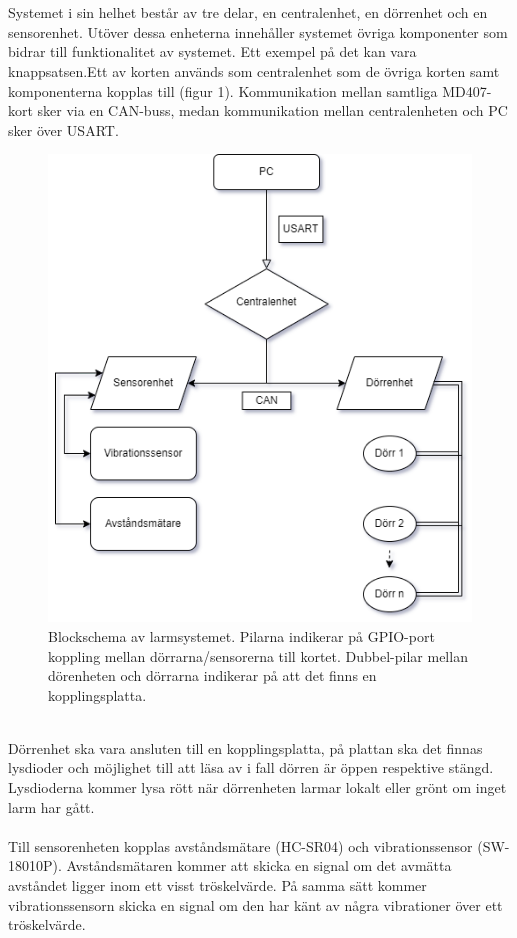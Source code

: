 \documentclass{article}
\begin{document}
\\
\\
\noindent
Systemet i sin helhet består av tre delar, en centralenhet, en dörrenhet och en sensorenhet. Utöver dessa enheterna innehåller systemet övriga komponenter som bidrar till funktionalitet av systemet. Ett exempel på det kan vara knappsatsen.Ett av korten används som centralenhet som de övriga korten samt komponenterna kopplas till (figur 1). Kommunikation mellan samtliga MD407-kort sker via en CAN-buss, medan kommunikation mellan centralenheten och PC sker över USART.
\\
\begin{figure}[h]
    \centering
    \includegraphics[scale=0.6]{Projektrapport/diagram.png}
     \caption {Blockschema av larmsystemet. Pilarna indikerar på GPIO-port koppling mellan dörrarna/sensorerna till kortet. Dubbel-pilar mellan dörenheten och dörrarna indikerar på att det finns en kopplingsplatta.}
    \label{fig:drawing}
\end{figure}
\newpage
\\
\noindent
Dörrenhet ska vara ansluten till en kopplingsplatta, på plattan ska det finnas lysdioder och möjlighet till att läsa av i fall dörren är öppen respektive stängd.
Lysdioderna kommer lysa rött när dörrenheten larmar lokalt eller grönt om inget larm har gått.
\\
\\
Till sensorenheten kopplas avståndsmätare (HC-SR04) och vibrationssensor (SW-18010P).
Avståndsmätaren kommer att skicka en signal om det avmätta avståndet ligger inom ett visst tröskelvärde.
På samma sätt kommer vibrationssensorn skicka en signal om den har känt av några vibrationer över ett tröskelvärde.
\end{document}
